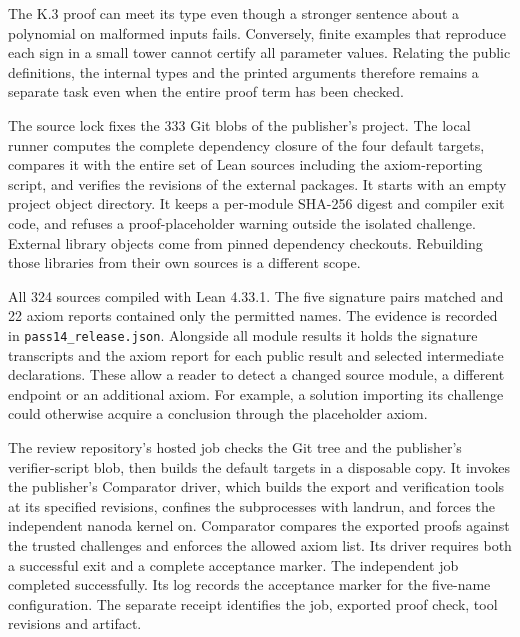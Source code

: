 The K.3 proof can meet its type even though a stronger sentence about a polynomial on malformed inputs fails. Conversely, finite examples that reproduce each sign in a small tower cannot certify all parameter values. Relating the public definitions, the internal types and the printed arguments therefore remains a separate task even when the entire proof term has been checked.


\clearpage
{}
The source lock fixes the 333 Git blobs of the publisher's project. The local runner computes the complete dependency closure of the four default targets, compares it with the entire set of Lean sources including the axiom-reporting script, and verifies the revisions of the external packages. It starts with an empty project object directory. It keeps a per-module SHA-256 digest and compiler exit code, and refuses a proof-placeholder warning outside the isolated challenge. External library objects come from pinned dependency checkouts. Rebuilding those libraries from their own sources is a different scope.

All 324 sources compiled with Lean 4.33.1. The five signature pairs matched and 22 axiom reports contained only the permitted names. The evidence is recorded in \texttt{pass14\_release.json}. Alongside all module results it holds the signature transcripts and the axiom report for each public result and selected intermediate declarations. These allow a reader to detect a changed source module, a different endpoint or an additional axiom. For example, a solution importing its challenge could otherwise acquire a conclusion through the placeholder axiom.

The review repository's hosted job checks the Git tree and the publisher's verifier-script blob, then builds the default targets in a disposable copy. It invokes the publisher's Comparator driver, which builds the export and verification tools at its specified revisions, confines the subprocesses with landrun, and forces the independent nanoda kernel on. Comparator compares the exported proofs against the trusted challenges and enforces the allowed axiom list. Its driver requires both a successful exit and a complete acceptance marker. The independent job completed successfully. Its log records the acceptance marker for the five-name configuration. The separate receipt identifies the job, exported proof check, tool revisions and artifact.

